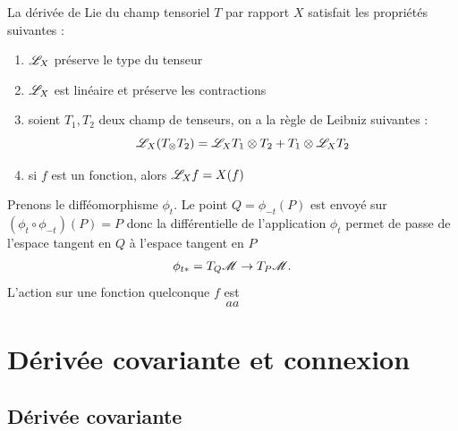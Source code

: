 \documentclass[a4paper,11pt]{report}
\begin{document}
            \begin{prop}
            \begin{leftbar}
                La dérivée de Lie du champ tensoriel $T$ par rapport $X$ satisfait les propriétés suivantes :
                \begin{enumerate}[label = \textit{\roman*)}]
                    \item $\mathscr{L}_X$ préserve le type du tenseur
                    \item $\mathscr{L}_X$ est linéaire et préserve les contractions
                    \item soient $T_1,T_2$ deux champ de tenseurs, on a la règle de Leibniz suivantes :
                    \begin{equation}
                        \mathscr{L}_X(T_\otimes T_2) = \mathscr{L}_X T_1\otimes T_2+T_1\otimes \mathscr{L}_X T_2
                    \end{equation}
                    \item si $f$ est un fonction, alors 
                    $\mathscr{L}_Xf = X(f)$
                \end{enumerate}
            \end{leftbar}
            \end{prop}
            
            Prenons le difféomorphisme $\phi_t$. Le point $Q = \phi_{-t}(P)$ est envoyé sur $(\phi_{t}\circ\phi_{-t})(P) = P$ donc la différentielle de l'application $\phi_t$ permet de passe de l'espace tangent en $Q$ à l'espace tangent en $P$
            \begin{equation}
                \phi_{t*}=T_Q\mathscr{M}\to T_P\mathscr{M}.
            \end{equation}
            L'action sur une fonction quelconque $f$ est 
            \begin{equation}
                aa
            \end{equation}
            
            \comp
            
        
        \section{Dérivée covariante et connexion}
        
            \subsection{Dérivée covariante}
        
\end{document}
